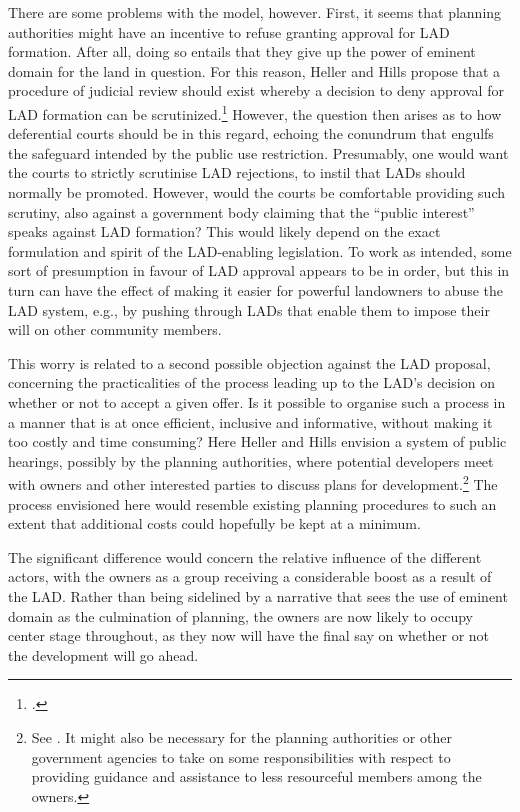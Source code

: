 There are some problems with the model, however. First, it seems that planning authorities might have an incentive to refuse granting approval for LAD formation. After all, doing so entails that they give up the power of eminent domain for the land in question. For this reason, Heller and Hills propose that a procedure of judicial review should exist whereby a decision to deny approval for LAD formation can be scrutinized.\footcite[1490]{heller08} However, the question then arises as to how deferential  courts should be in this regard, echoing the conundrum that engulfs the safeguard intended by the public use restriction. Presumably, one would want the courts to strictly scrutinise LAD rejections, to instil that LADs should normally be promoted. However, would the courts be comfortable providing such scrutiny, also against a government body claiming that the ``public interest'' speaks against LAD formation? This would likely depend on the exact formulation and spirit of the LAD-enabling legislation. To work as intended, some sort of presumption in favour of LAD approval appears to be in order, but this in turn can have the effect of making it easier for powerful landowners to abuse the LAD system, e.g., by pushing through LADs that enable them to impose their will on other community members.

This worry is related to a second possible objection against the LAD proposal, concerning the practicalities of the process leading up to the LAD's decision on whether or not to accept a given offer. Is it possible to organise such a process in a manner that is at once efficient, inclusive and informative, without making it too costly and time consuming? Here Heller and Hills envision a system of public hearings, possibly  by the planning authorities, where potential developers meet with owners and other interested parties to discuss plans for development.\footnote{See \cite[1490-1491]{heller08}. It might also be necessary for the planning authorities or other government agencies to take on some responsibilities with respect to providing guidance and assistance to less resourceful members among the owners.} The process envisioned here would resemble existing planning procedures to such an extent that additional costs could hopefully be kept at a minimum. 

The significant difference would concern the relative influence of the different actors, with the   owners as a group receiving a considerable boost as a result of the LAD. Rather than being sidelined by a narrative that sees the use of eminent domain as the culmination of planning, the owners are now likely to occupy center stage throughout, as they now will have the final say on whether or not the development will go ahead.

